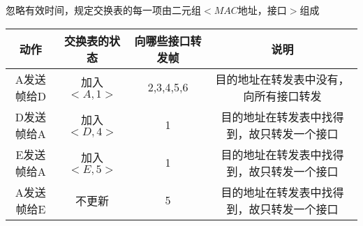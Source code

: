 \documentclass{ctexart}
\begin{document}
\answer[3-33]
忽略有效时间，规定交换表的每一项由二元组$<MAC\mbox{地址，接口}>$组成
\begin{table}[htbp]
    \centering
    \begin{tabular}{|c|c|c|c|}
        \hline
        动作&交换表的状态&向哪些接口转发帧&说明\\
        \hline
        A发送帧给D&加入$<A,1>$&2,3,4,5,6&目的地址在转发表中没有，向所有接口转发\\
        \hline
        D发送帧给A&加入$<D,4>$&1&目的地址在转发表中找得到，故只转发一个接口\\
        \hline
        E发送帧给A&加入$<E,5>$&1&目的地址在转发表中找得到，故只转发一个接口\\
        \hline
        A发送帧给E&不更新&5&目的地址在转发表中找得到，故只转发一个接口\\
        \hline
    \end{tabular}
\end{table}
\end{document}
